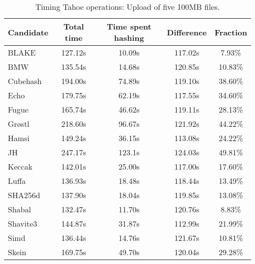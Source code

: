 \begin{table}[h]
  \centering
  \caption{Timing Tahoe operations: Upload of five 100MB files.}
  \begin{tabular}{ | l | c | c | c | c | }
    \hline
    Candidate & Total time & Time spent hashing & Difference & Fraction \\ \hline
    BLAKE     &  127.12s  &  10.09s  &  117.02s  &  7.93\%   \\  \hline
    BMW       &  135.54s  &  14.68s  &  120.85s  &  10.83\%  \\  \hline
    Cubehash  &  194.00s  &  74.89s  &  119.10s  &  38.60\%  \\  \hline
    Echo      &  179.75s  &  62.19s  &  117.55s  &  34.60\%  \\  \hline
    Fugue     &  165.74s  &  46.62s  &  119.11s  &  28.13\%  \\  \hline
    Grøstl    &  218.60s  &  96.67s  &  121.92s  &  44.22\%  \\  \hline
    Hamsi     &  149.24s  &  36.15s  &  113.08s  &  24.22\%  \\  \hline
    JH        &  247.17s  &  123.1s  &  124.03s  &  49.81\%  \\  \hline
    Keccak    &  142.01s  &  25.00s  &  117.00s  &  17.60\%  \\  \hline
    Luffa     &  136.93s  &  18.48s  &  118.44s  &  13.49\%  \\  \hline
    SHA256d   &  137.90s  &  18.04s  &  119.85s  &  13.08\%  \\  \hline
    Shabal    &  132.47s  &  11.70s  &  120.76s  &  8.83\%   \\  \hline
    Shavite3  &  144.87s  &  31.87s  &  112.99s  &  21.99\%  \\  \hline
    Simd      &  136.44s  &  14.76s  &  121.67s  &  10.81\%  \\  \hline
    Skein     &  169.75s  &  49.70s  &  120.04s  &  29.28\%  \\  \hline
  \end{tabular}
  \label{tbl:hashingtimes:put100mb}
\end{table}

